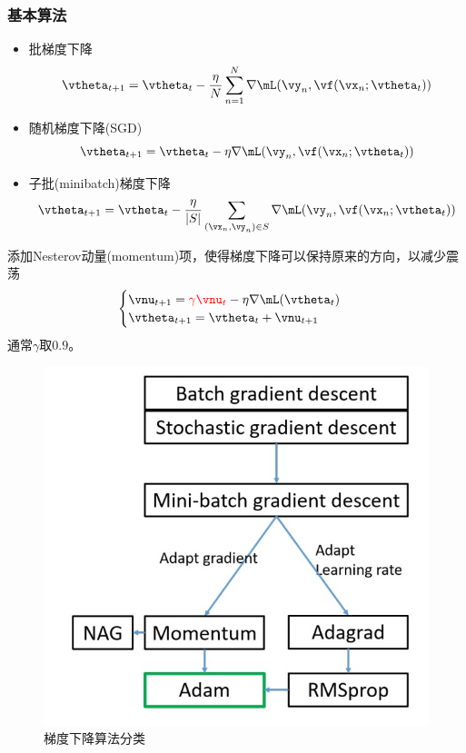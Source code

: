 \subsubsection{基本算法}
\begin{itemize}
    \item 批梯度下降
    \[\vtheta_{t+1}=\vtheta_t-\frac{\eta}{N}\sum_{n=1}^N\nabla\mL(\vy_n,\vf(\vx_n;\vtheta_t))\]
    \item 随机梯度下降(SGD)
    \[\vtheta_{t+1}=\vtheta_t-\eta\nabla\mL(\vy_n,\vf(\vx_n;\vtheta_t))\]
    \item 子批(minibatch)梯度下降
    \[\vtheta_{t+1}=\vtheta_t-\frac{\eta}{|S|}\sum_{(\vx_n,\vy_n)\in S}\nabla\mL(\vy_n,\vf(\vx_n;\vtheta_t))\]
\end{itemize}

添加Nesterov动量(momentum)项，使得梯度下降可以保持原来的方向，以减少震荡
\[\begin{cases}
    \vnu_{t+1}=\textcolor{red}{\gamma\vnu_t}-\eta\nabla\mL(\vtheta_t)\\
    \vtheta_{t+1}=\vtheta_t+\vnu_{t+1}
\end{cases}\]
通常$\gamma$取$0.9$。

\begin{figure}[H]
\centering
\includegraphics[width=0.5\linewidth]{fig/gd_catalog.jpg}
\caption{梯度下降算法分类}
\end{figure}
